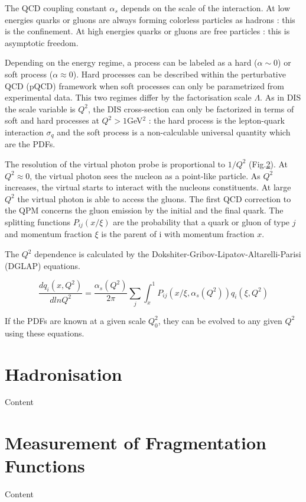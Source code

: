 The QCD coupling constant $\alpha_s$ depends on the scale of the interaction. At low energies quarks or gluons are always
forming colorless particles as hadrons : this is the confinement. At high energies quarks or gluons are free particles :
this is asymptotic freedom.

Depending on the energy regime, a process can be labeled as a hard ($\alpha \sim 0$) or soft process ($\alpha \approx 0$).
Hard processes can be described within the perturbative QCD (pQCD) framework when soft processes can only be parametrized
from experimental data. This two regimes differ by the factorisation scale $\Lambda$. As in DIS the scale variable is $Q^2$,
the DIS cross-section can only be factorized in terms of soft and hard processes at $Q^2>1$GeV$^2$ : the hard process is the
lepton-quark interaction $\sigma_q$ and the soft process is a non-calculable universal quantity which are the PDFs.

The resolution of the virtual photon probe is proportional to $1/Q^2$ (Fig.\ref{}). At $Q^2 \approx 0$, the virtual photon sees the
nucleon as a point-like particle. As $Q^2$ increases, the virtual starts to interact with the nucleons constituents. At large $Q^2$
the virtual photon is able to access the gluons. The first QCD correction to the QPM concerns the gluon emission by the initial and
the final quark. The splitting functions $P_{ij}(x/\xi)$ are the probability that a quark or gluon of type $j$ and momentum fraction
$\xi$ is the parent of i with momentum fraction $x$.


The $Q^2$ dependence is calculated by the Dokshiter-Gribov-Lipatov-Altarelli-Parisi (DGLAP) equations.

\begin{equation}
  \frac{dq_i(x,Q^2)}{dlnQ^2} = \frac{\alpha_s(Q^2)}{2\pi}\sum\limits_{j}\int_{x}^{1}P_{ij}(x/\xi,\alpha_s(Q^2))q_i(\xi,Q^2)
\end{equation}

If the PDFs are known at a given scale $Q_0^2$, they can be evolved to any given $Q^2$ using these equations. 


\section{Hadronisation}

Content


\section{Measurement of Fragmentation Functions}

Content
